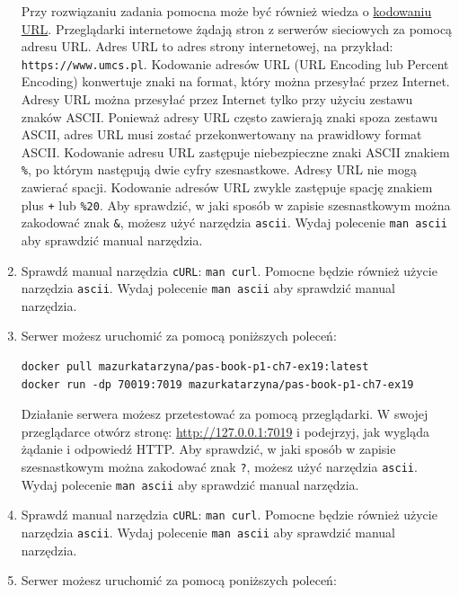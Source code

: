 \begin{enumerate}[label=\textbf{7.\arabic*}]
 \noindent Przy rozwiązaniu zadania pomocna może być również wiedza o  \href{https://www.w3schools.com/tags/ref_urlencode.ASP}{kodowaniu URL}.  Przeglądarki internetowe żądają stron z serwerów sieciowych za pomocą adresu URL. Adres URL to adres strony internetowej, na przykład: \texttt{https://www.umcs.pl}. Kodowanie adresów URL (URL Encoding lub Percent Encoding) konwertuje znaki na format, który można przesyłać przez Internet. Adresy URL można przesyłać przez Internet tylko przy użyciu zestawu znaków ASCII. Ponieważ adresy URL często zawierają znaki spoza zestawu ASCII, adres URL musi zostać przekonwertowany na prawidłowy format ASCII. Kodowanie adresu URL zastępuje niebezpieczne znaki ASCII znakiem \texttt{\%}, po którym następują dwie cyfry szesnastkowe. Adresy URL nie mogą zawierać spacji. Kodowanie adresów URL zwykle zastępuje spację znakiem plus \texttt{+} lub \texttt{\%20}. Aby sprawdzić,  w jaki sposób w zapisie szesnastkowym można zakodować znak \texttt{\&}, możesz użyć narzędzia \texttt{ascii}. Wydaj polecenie \texttt{man ascii} aby sprawdzić manual narzędzia.
\item  Sprawdź manual narzędzia \texttt{cURL}: \texttt{man curl}. Pomocne będzie również użycie narzędzia \texttt{ascii}. Wydaj polecenie \texttt{man ascii} aby sprawdzić manual narzędzia.
\item Serwer możesz uruchomić za pomocą poniższych poleceń:

\begin{verbatim}
docker pull mazurkatarzyna/pas-book-p1-ch7-ex19:latest
docker run -dp 70019:7019 mazurkatarzyna/pas-book-p1-ch7-ex19
\end{verbatim}

\noindent Działanie serwera możesz przetestować za pomocą przeglądarki. W swojej przeglądarce otwórz stronę: \url{http://127.0.0.1:7019} i podejrzyj, jak wygląda żądanie i odpowiedź HTTP. Aby sprawdzić,  w jaki sposób w zapisie szesnastkowym można zakodować znak \texttt{?}, możesz użyć narzędzia \texttt{ascii}. Wydaj polecenie \texttt{man ascii} aby sprawdzić manual narzędzia.
\item Sprawdź manual narzędzia \texttt{cURL}: \texttt{man curl}. Pomocne będzie również użycie narzędzia \texttt{ascii}. Wydaj polecenie \texttt{man ascii} aby sprawdzić manual narzędzia.
\item Serwer możesz uruchomić za pomocą poniższych poleceń:


\end{enumerate}
